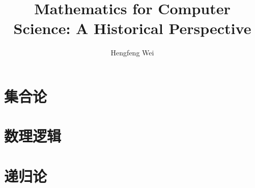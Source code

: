 \documentclass{amsbook}
\begin{document}
\frontmatter
\title[math4cs-history]{Mathematics for Computer Science: A Historical Perspective}
\author[hengxin]{Hengfeng Wei}
\address[NJU]{Nanjing University\\
Nanjing, China}



\maketitle
\tableofcontents



\mainmatter

\part{集合论}



\part{数理逻辑}


\part{递归论}


\backmatter\appendix

% 
\end{document}
